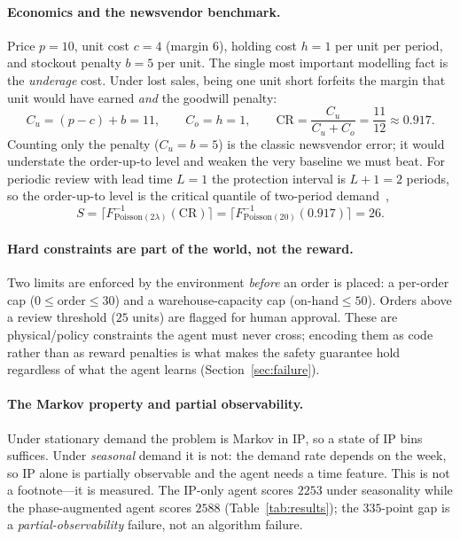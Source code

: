 \documentclass[11pt]{article}
\begin{document}
\paragraph{Economics and the newsvendor benchmark.}
Price $p=10$, unit cost $c=4$ (margin $6$), holding cost $h=1$ per unit per period, and
stockout penalty $b=5$ per unit. The single most important modelling fact is the
\emph{underage} cost. Under lost sales, being one unit short forfeits the margin that unit would
have earned \emph{and} the goodwill penalty:
\begin{equation}
  C_u = (p-c) + b = 11, \qquad C_o = h = 1, \qquad
  \mathrm{CR} = \frac{C_u}{C_u + C_o} = \frac{11}{12} \approx 0.917 .
\end{equation}
Counting only the penalty ($C_u=b=5$) is the classic newsvendor error; it would understate the
order-up-to level and weaken the very baseline we must beat. For periodic review with lead time
$L=1$ the protection interval is $L+1=2$ periods, so the order-up-to level is the critical
quantile of two-period demand~\cite{zipkin},
\begin{equation}
  S = \big\lceil F^{-1}_{\mathrm{Poisson}(2\lambda)}(\mathrm{CR}) \big\rceil
    = \big\lceil F^{-1}_{\mathrm{Poisson}(20)}(0.917) \big\rceil = 26 .
\end{equation}

\paragraph{Hard constraints are part of the world, not the reward.}
Two limits are enforced by the environment \emph{before} an order is placed: a per-order cap
($0\le \text{order}\le 30$) and a warehouse-capacity cap ($\text{on-hand}\le 50$). Orders above a
review threshold ($25$ units) are flagged for human approval. These are physical/policy
constraints the agent must never cross; encoding them as code rather than as reward penalties is
what makes the safety guarantee hold regardless of what the agent learns
(Section~\ref{sec:failure}).

\paragraph{The Markov property and partial observability.}
\label{sec:markov}
Under stationary demand the problem is Markov in $\mathrm{IP}$, so a state of $\mathrm{IP}$ bins
suffices. Under \emph{seasonal} demand it is not: the demand rate depends on the week, so
$\mathrm{IP}$ alone is partially observable and the agent needs a time feature. This is not a
footnote---it is measured. The $\mathrm{IP}$-only agent scores $2253$ under seasonality while the
phase-augmented agent scores $2588$ (Table~\ref{tab:results}); the $335$-point gap is a
\emph{partial-observability} failure, not an algorithm failure.
\end{document}
